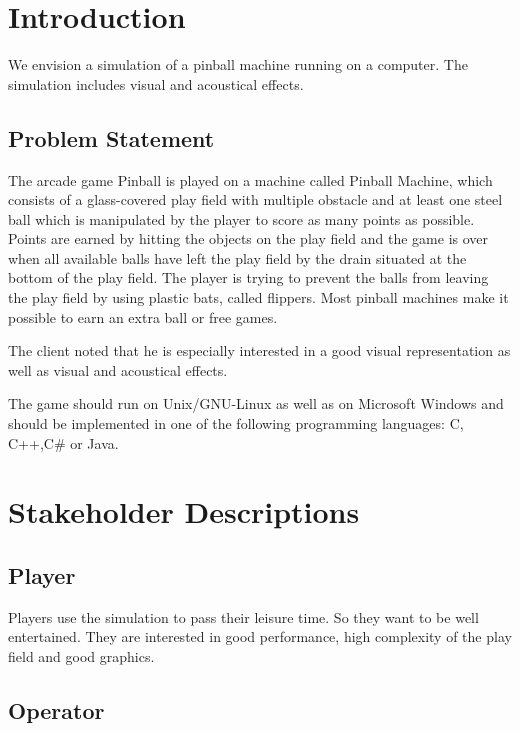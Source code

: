 \documentclass[fontsize=12pt,
               paper=a4,
               twoside=false,
               parskip=half,
               ]{scrartcl}
\begin{document}
\newcommand{\doctitle}{Vision}


\tableofcontents

\section{Introduction}

We envision a simulation of a pinball machine running on a computer. The simulation includes visual and acoustical effects.

\subsection{Problem Statement}

The arcade game Pinball is played on a machine called Pinball Machine, which consists of a glass-covered play field with multiple obstacle and at least one steel ball which is manipulated by the player to score as many points as possible. Points are earned by hitting the objects on the play field and the game is over when all available balls have left the play field by the drain situated at the bottom of the play field. The player is trying to prevent the balls from leaving the play field by using plastic bats, called flippers. Most pinball machines make it possible to earn an extra ball or free games.

The client noted that he is especially interested in a good visual representation as well as visual and acoustical effects.

The game should run on Unix/GNU-Linux as well as on Microsoft Windows and should be implemented in one of the following programming languages: C, C++,C\# or Java.


\section{Stakeholder Descriptions}

\subsection{Player}

Players use the simulation to pass their leisure time. So they want to be well entertained. They are interested in good performance, high complexity of the play field and good graphics.

\subsection{Operator}
\end{document}
